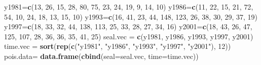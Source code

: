\documentclass[
]{book}
\newenvironment{Shaded}{\begin{snugshade}}{\end{snugshade}}
\newcommand{\AttributeTok}[1]{\textcolor[rgb]{0.13,0.29,0.53}{#1}}
\newcommand{\DecValTok}[1]{\textcolor[rgb]{0.00,0.00,0.81}{#1}}
\newcommand{\FunctionTok}[1]{\textcolor[rgb]{0.13,0.29,0.53}{\textbf{#1}}}
\newcommand{\NormalTok}[1]{#1}
\newcommand{\OtherTok}[1]{\textcolor[rgb]{0.56,0.35,0.01}{#1}}
\newcommand{\StringTok}[1]{\textcolor[rgb]{0.31,0.60,0.02}{#1}}
\begin{document}
\begin{Shaded}
\begin{Highlighting}[]
\NormalTok{y1981}\OtherTok{=}\FunctionTok{c}\NormalTok{(}\DecValTok{13}\NormalTok{, }\DecValTok{26}\NormalTok{, }\DecValTok{15}\NormalTok{, }\DecValTok{28}\NormalTok{, }\DecValTok{80}\NormalTok{, }\DecValTok{75}\NormalTok{, }\DecValTok{23}\NormalTok{, }\DecValTok{24}\NormalTok{, }\DecValTok{19}\NormalTok{, }\DecValTok{9}\NormalTok{, }\DecValTok{14}\NormalTok{, }\DecValTok{10}\NormalTok{)}
\NormalTok{y1986}\OtherTok{=}\FunctionTok{c}\NormalTok{(}\DecValTok{11}\NormalTok{, }\DecValTok{22}\NormalTok{, }\DecValTok{15}\NormalTok{, }\DecValTok{21}\NormalTok{, }\DecValTok{72}\NormalTok{, }\DecValTok{54}\NormalTok{, }\DecValTok{10}\NormalTok{, }\DecValTok{24}\NormalTok{, }\DecValTok{18}\NormalTok{, }\DecValTok{13}\NormalTok{, }\DecValTok{15}\NormalTok{, }\DecValTok{10}\NormalTok{)}
\NormalTok{y1993}\OtherTok{=}\FunctionTok{c}\NormalTok{(}\DecValTok{16}\NormalTok{, }\DecValTok{41}\NormalTok{, }\DecValTok{23}\NormalTok{, }\DecValTok{44}\NormalTok{, }\DecValTok{148}\NormalTok{, }\DecValTok{123}\NormalTok{, }\DecValTok{26}\NormalTok{, }\DecValTok{38}\NormalTok{, }\DecValTok{30}\NormalTok{, }\DecValTok{29}\NormalTok{, }\DecValTok{37}\NormalTok{, }\DecValTok{19}\NormalTok{)}
\NormalTok{y1997}\OtherTok{=}\FunctionTok{c}\NormalTok{(}\DecValTok{18}\NormalTok{, }\DecValTok{33}\NormalTok{, }\DecValTok{32}\NormalTok{, }\DecValTok{44}\NormalTok{, }\DecValTok{138}\NormalTok{, }\DecValTok{113}\NormalTok{, }\DecValTok{25}\NormalTok{, }\DecValTok{33}\NormalTok{, }\DecValTok{28}\NormalTok{, }\DecValTok{27}\NormalTok{, }\DecValTok{34}\NormalTok{, }\DecValTok{16}\NormalTok{)}
\NormalTok{y2001}\OtherTok{=}\FunctionTok{c}\NormalTok{(}\DecValTok{18}\NormalTok{, }\DecValTok{43}\NormalTok{, }\DecValTok{26}\NormalTok{, }\DecValTok{47}\NormalTok{, }\DecValTok{125}\NormalTok{, }\DecValTok{107}\NormalTok{, }\DecValTok{28}\NormalTok{, }\DecValTok{36}\NormalTok{, }\DecValTok{36}\NormalTok{, }\DecValTok{35}\NormalTok{, }\DecValTok{41}\NormalTok{, }\DecValTok{25}\NormalTok{)}
\NormalTok{seal.vec }\OtherTok{=} \FunctionTok{c}\NormalTok{(y1981, y1986, y1993, y1997, y2001)}
\NormalTok{time.vec }\OtherTok{=} \FunctionTok{sort}\NormalTok{(}\FunctionTok{rep}\NormalTok{(}\FunctionTok{c}\NormalTok{(}\StringTok{"y1981"}\NormalTok{, }\StringTok{"y1986"}\NormalTok{, }\StringTok{"y1993"}\NormalTok{, }\StringTok{"y1997"}\NormalTok{, }\StringTok{"y2001"}\NormalTok{), }\DecValTok{12}\NormalTok{))}
\NormalTok{pois.data}\OtherTok{=} \FunctionTok{data.frame}\NormalTok{(}\FunctionTok{cbind}\NormalTok{(}\AttributeTok{seal=}\NormalTok{seal.vec, }\AttributeTok{time=}\NormalTok{time.vec))}
\end{Highlighting}
\end{Shaded}
\end{document}
